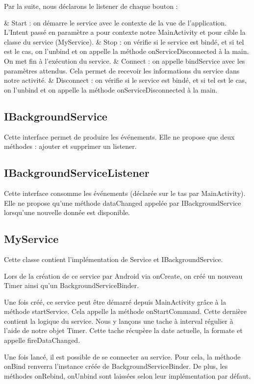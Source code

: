 \documentclass{report}
\begin{document}
			Par la suite, nous déclarons le listener de chaque bouton :
			\begin{easylist}[itemize]
				& Start : on démarre le service avec le contexte de la vue de l'application.
				L'Intent passé en paramètre a pour contexte notre MainActivity et pour cible la classe du service (MyService).
				& Stop : on vérifie si le service est bindé, et si tel est le cas, on l'unbind et on appelle la méthode onServiceDisconnected à la main. 
				On met fin à l'exécution du service.
				& Connect : on appelle bindService avec les paramètres attendus.
				Cela permet de recevoir les informations du service dans notre activité.
				& Disconnect : on vérifie si le service est bindé, et si tel est le cas, on l'unbind et on appelle la méthode onServiceDisconnected à la main. 
			\end{easylist}

		\subsection{IBackgroundService}
			Cette interface permet de produire les événements. Elle ne propose que deux méthodes : ajouter et supprimer un listener.

		\subsection{IBackgroundServiceListener}
			Cette interface consomme les événements (déclarée sur le tas par MainActivity).
			Elle ne propose qu'une méthode dataChanged appelée par IBackgroundService lorsqu'une nouvelle donnée est disponible.
		
		\subsection{MyService}
			Cette classe contient l'implémentation de Service et IBackgroundService.

			Lors de la création de ce service par Android via onCreate, on créé un nouveau Timer ainsi qu'un BackgroundServiceBinder. 

			Une fois créé, ce service peut être démarré depuis MainActivity grâce à la méthode startService.
			Cela appelle la méthode onStartCommand.
			Cette dernière contient la logique du service.
			Nous y lançons une tache à interval régulier à l'aide de notre objet Timer.
			Cette tache récupère la date actuelle, la formate et appelle fireDataChanged.

			Une fois lancé, il est possible de se connecter au service.
			Pour cela, la méthode onBind renverra l'instance créée de BackgroundServiceBinder.
			De plus, les méthodes onRebind, onUnbind sont laissées selon leur implémentation par défaut.
\end{document}

